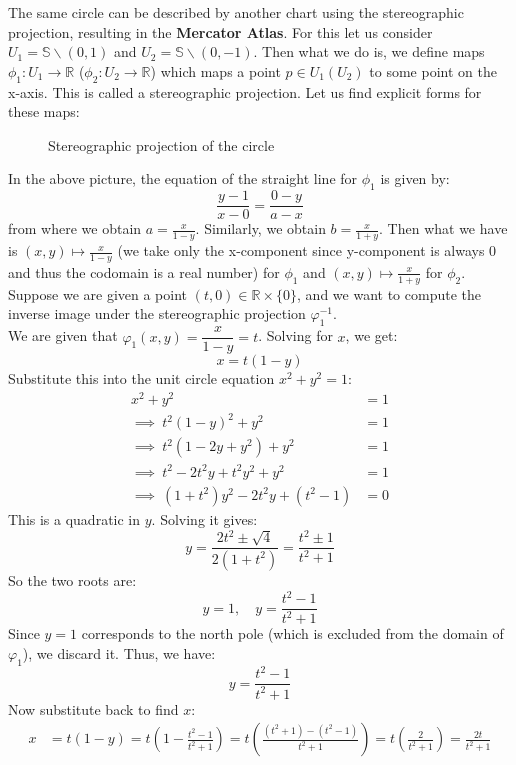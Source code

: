 \noindent
The same circle can be described by another chart using the stereographic projection, resulting in the \textbf{Mercator Atlas}. For this let us consider $U_1 = \mathbb{S}\backslash(0,1)$ and $U_2 = \mathbb{S}\backslash(0,-1)$. Then what we do is, we define maps $\phi_1: U_1 \rightarrow \mathbb{R}$ ($\phi_2:U_2 \rightarrow \mathbb{R}$) which maps a point $p\in U_1(U_2)$ to some point on the x-axis. This is called a stereographic projection.  Let us find explicit forms for these maps:
\begin{figure}[H]
  \centering
  
  \caption{Stereographic projection of the circle} 
\end{figure}
\noindent
In the above picture, the equation of the straight line for $\phi_1$ is given by:
$$\frac{y-1}{x-0} = \frac{0-y}{a-x}$$ from where we obtain $a=\frac{x}{1-y}$. Similarly, we obtain $b = \frac{x}{1+y}$. Then what we have is $(x,y) \mapsto \frac{x}{1-y}$ (we take only the x-component since y-component is always 0 and thus the codomain is a real number) for $\phi_1$ and $(x,y) \mapsto \frac{x}{1+y}$ for $\phi_2$.  Suppose we are given a point \( (t, 0) \in \mathbb{R} \times \{0\} \), and we want to compute the inverse image under the stereographic projection \( \varphi_1^{-1} \).\\[0.2cm]
We are given that \( \varphi_1(x, y) = \dfrac{x}{1 - y} = t \). Solving for \( x \), we get:
\[
x = t(1 - y)
\]
Substitute this into the unit circle equation \( x^2 + y^2 = 1 \):
\begin{align*}
x^2 + y^2 &= 1 \\
\implies \ t^2(1 - y)^2 + y^2 &= 1 \\
\implies \ t^2(1 - 2y + y^2) + y^2 &= 1 \\
\implies \ t^2 - 2t^2 y + t^2 y^2 + y^2 &= 1 \\
\implies \ (1 + t^2)y^2 - 2t^2 y + (t^2 - 1) &= 0
\end{align*}
This is a quadratic in \( y \). Solving it gives:
\[
y = \frac{2t^2 \pm \sqrt{4}}{2(1 + t^2)} = \frac{t^2 \pm 1}{t^2 + 1}
\]
So the two roots are:
\[
y = 1, \quad y = \frac{t^2 - 1}{t^2 + 1}
\]
Since \( y = 1 \) corresponds to the north pole (which is excluded from the domain of \( \varphi_1 \)), we discard it. Thus, we have:
\[
y = \frac{t^2 - 1}{t^2 + 1}
\]
Now substitute back to find \( x \):
\begin{align*}
x &= t(1 - y) = t \left(1 - \frac{t^2 - 1}{t^2 + 1} \right)
= t \left( \frac{(t^2 + 1) - (t^2 - 1)}{t^2 + 1} \right)
= t \left( \frac{2}{t^2 + 1} \right)
= \frac{2t}{t^2 + 1}
\end{align*}

